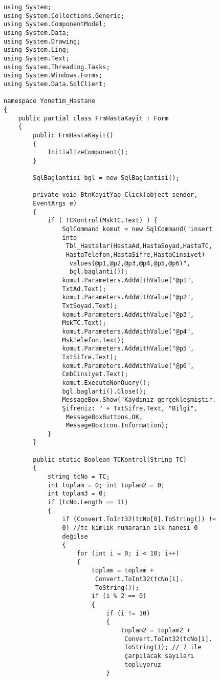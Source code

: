\begin{lstlisting}
using System;
using System.Collections.Generic;
using System.ComponentModel;
using System.Data;
using System.Drawing;
using System.Linq;
using System.Text;
using System.Threading.Tasks;
using System.Windows.Forms;
using System.Data.SqlClient;

namespace Yonetim_Hastane
{
    public partial class FrmHastaKayit : Form
    {
        public FrmHastaKayit()
        {
            InitializeComponent();
        }

        SqlBaglantisi bgl = new SqlBaglantisi();

        private void BtnKayitYap_Click(object sender, 
        EventArgs e)
        {
            if ( TCKontrol(MskTC.Text) ) {
                SqlCommand komut = new SqlCommand("insert 
                into
                 Tbl_Hastalar(HastaAd,HastaSoyad,HastaTC,
                 HastaTelefon,HastaSifre,HastaCinsiyet)
                  values(@p1,@p2,@p3,@p4,@p5,@p6)", 
                  bgl.baglanti());
                komut.Parameters.AddWithValue("@p1", 
                TxtAd.Text);
                komut.Parameters.AddWithValue("@p2", 
                TxtSoyad.Text);
                komut.Parameters.AddWithValue("@p3", 
                MskTC.Text);
                komut.Parameters.AddWithValue("@p4", 
                MskTelefon.Text);
                komut.Parameters.AddWithValue("@p5", 
                TxtSifre.Text);
                komut.Parameters.AddWithValue("@p6", 
                CmbCinsiyet.Text);
                komut.ExecuteNonQuery();
                bgl.baglanti().Close();
                MessageBox.Show("Kaydınız gerçekleşmiştir. 
                Şifreniz: " + TxtSifre.Text, "Bilgi",
                 MessageBoxButtons.OK, 
                 MessageBoxIcon.Information);
            }
        }

        public static Boolean TCKontrol(String TC)
        {
            string tcNo = TC;
            int toplam = 0; int toplam2 = 0; 
            int toplam3 = 0;
            if (tcNo.Length == 11)
            {
                if (Convert.ToInt32(tcNo[0].ToString()) != 
                0) //tc kimlik numaranın ilk hanesi 0 
                değilse
                {
                    for (int i = 0; i < 10; i++)
                    {
                        toplam = toplam +
                         Convert.ToInt32(tcNo[i].
                         ToString());
                        if (i % 2 == 0)
                        {
                            if (i != 10)
                            {
                                toplam2 = toplam2 +
                                 Convert.ToInt32(tcNo[i].
                                 ToString()); // 7 ile 
                                 çarpılacak sayıları 
                                 topluyoruz
                            }


\end{lstlisting}
